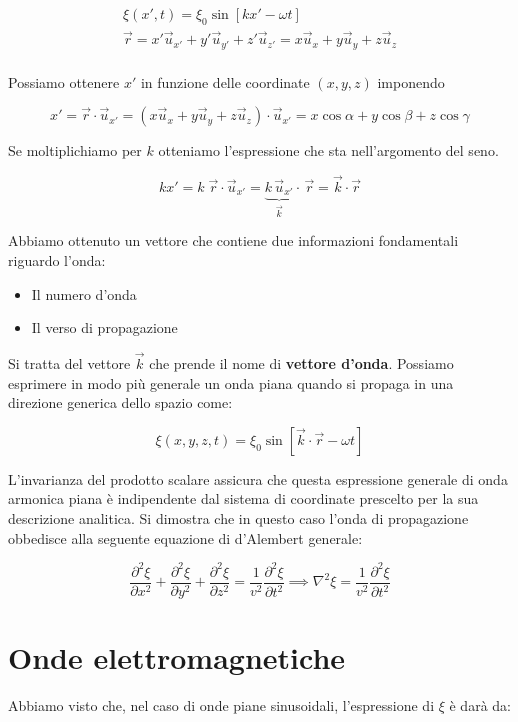 \begin{gather*}
	\xi(x',t) = \xi_0 \sin [kx'-\omega t] \\
	\vec{r} = x'\vec{u}_{x'}+y'\vec{u}_{y'}+z'\vec{u}_{z'} = x\vec{u}_x+y\vec{u}_y+z\vec{u}_z \\
\end{gather*}

Possiamo ottenere $ x' $ in funzione delle coordinate $ (x,y,z)  $ imponendo

\[
	x'=\vec{r} \cdot \vec{u}_{x'} = (x\vec{u}_x+y\vec{u}_y+z\vec{u}_z) \cdot  \vec{u}_{x'} = x\cos \alpha + y\cos \beta + z \cos \gamma
\]

Se moltiplichiamo per $k$ otteniamo l'espressione che sta nell'argomento del seno.

\[
	kx'=k\;\vec{r} \cdot \vec{u}_{x'} = \underbrace{k\,\vec{u}_{x'}}_{\vec{k}} \cdot \,\vec{r} = \vec{k} \cdot \vec{r}
\]

Abbiamo ottenuto un vettore che contiene due informazioni fondamentali riguardo l'onda:

\begin{itemize}
	\item Il numero d'onda
	\item Il verso di propagazione
\end{itemize}

Si tratta del vettore $ \vec{k}  $ che prende il nome di \textbf{vettore d'onda}. Possiamo esprimere in modo più generale un onda piana quando si propaga in una direzione generica dello spazio come:

\[
	\xi(x,y,z,t) = \xi_0\sin [\vec{k} \cdot \vec{r} -\omega t]
\]

L'invarianza del prodotto scalare assicura che questa espressione generale di onda armonica piana è indipendente dal sistema di coordinate prescelto per la sua descrizione analitica. Si dimostra che in questo caso l'onda di propagazione obbedisce alla seguente equazione di d'Alembert generale:

\[
	\frac{\partial^2 \xi}{\partial x^2} + \frac{\partial^2 \xi}{\partial y^2} + \frac{\partial^2 \xi}{\partial z^2} = \frac{1}{v^2} \frac{\partial^2 \xi}{\partial t^2} \implies \nabla^2 \xi = \frac{1}{v^2} \frac{\partial^2 \xi}{\partial t^2}
\]

\section{Onde elettromagnetiche}

Abbiamo visto che, nel caso di onde piane sinusoidali, l'espressione di $\xi$ è darà da:

